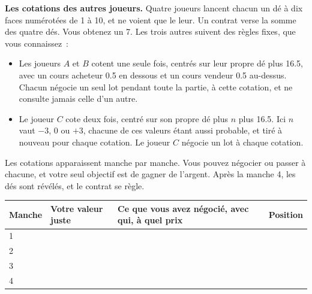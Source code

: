 \begin{question}\label{iq:iv2:played-games:10}
\textbf{Les cotations des autres joueurs.} Quatre joueurs lancent chacun un dé à dix faces numérotées de 1 à 10, et ne voient que le leur. Un contrat verse la somme des quatre dés. Vous obtenez un 7. Les trois autres suivent des règles fixes, que vous connaissez~:
\begin{itemize}
\item Les joueurs $A$ et $B$ cotent une seule fois, centrés sur leur propre dé plus 16.5, avec un cours acheteur 0.5 en dessous et un cours vendeur 0.5 au-dessus. Chacun négocie un seul lot pendant toute la partie, à cette cotation, et ne consulte jamais celle d'un autre.
\item Le joueur $C$ cote deux fois, centré sur son propre dé plus $n$ plus 16.5. Ici $n$ vaut $-3$, 0 ou $+3$, chacune de ces valeurs étant aussi probable, et tiré à nouveau pour chaque cotation. Le joueur $C$ négocie un lot à chaque cotation.
\end{itemize}
Les cotations apparaissent manche par manche. Vous pouvez négocier ou passer à chacune, et votre seul objectif est de gagner de l'argent. Après la manche 4, les dés sont révélés, et le contrat se règle.

\medskip
\begin{tabular}{@{}l|l|p{5cm}|l@{}}
Manche & Votre valeur juste & Ce que vous avez négocié, avec qui, à quel prix & Position \\ \hline
1 & & & \\[8pt]\hline
2 & & & \\[8pt]\hline
3 & & & \\[8pt]\hline
4 & & & \\[8pt]\hline
\end{tabular}
\end{question}
\vfill\clearpage

